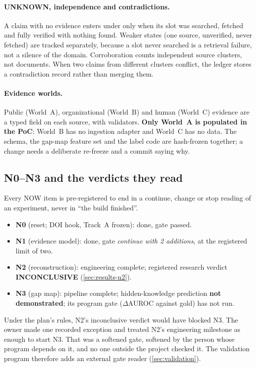 \paragraph{UNKNOWN, independence and contradictions.} \evobs{} A claim with no evidence enters under
 only when its slot was searched, fetched and fully verified with nothing found. Weaker
states (one source, unverified, never fetched) are tracked separately, because a slot never searched is
a retrieval failure, not a silence of the domain. Corroboration counts independent source clusters, not
documents. When two claims from different clusters conflict, the ledger stores a contradiction record
rather than merging them.

\paragraph{Evidence worlds.} \evobs{} Public (World~A), organizational (World~B) and human (World~C)
evidence are a typed field on each source, with validators. \textbf{Only World~A is populated in the
PoC}: World~B has no ingestion adapter and World~C has no data. The schema, the gap-map feature set and
the label code are hash-frozen together; a change needs a deliberate re-freeze and a commit saying why.

\subsection{N0--N3 and the verdicts they read}

\evobs{} Every NOW item is pre-registered to end in a continue, change or stop reading of an
experiment, never in \enquote{the build finished}.
\begin{itemize}[nosep]
  \item \textbf{N0} (reset; DOI hook, Track~A frozen): done, gate passed.
  \item \textbf{N1} (evidence model): done, gate \emph{continue with 2 additions}, at the registered
    limit of two.
  \item \textbf{N2} (reconstruction): engineering complete; registered research verdict
    \textbf{INCONCLUSIVE} (\cref{sec:results-n2}).
  \item \textbf{N3} (gap map): pipeline complete; hidden-knowledge prediction \textbf{not demonstrated};
    its program gate ($\Delta$AUROC against gold) has not run.
\end{itemize}
\evint{} Under the plan's rules, N2's inconclusive verdict would have blocked N3. The owner made one
recorded exception and treated N2's engineering milestone as enough to start N3. That was a softened
gate, softened by the person whose program depends on it, and no one outside the project checked it.
The validation program therefore adds an external gate reader (\cref{sec:validation}).
